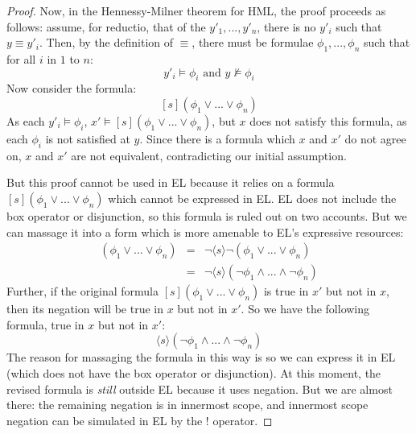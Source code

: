 \documentclass[smallextended]{svjour3}       %
\numberwithin{subcase}{mycase}
\begin{document}
\begin{proof}
Now, in the Hennessy-Milner theorem for HML, the proof proceeds as follows:
assume, for reductio, that of the $y'_1, ..., y'_n$, there is no $y'_i$ such that $y \equiv y'_i$.
Then, by the definition of $\equiv$, there must be formulae $\phi_1, ..., \phi_n$ such that for all $i$ in $1$ to $n$:
\[
y'_i \models \phi_i \mbox{ and } y \nvDash \phi_i
\]
Now consider the formula:
\[
[s] (\phi_1 \lor ... \lor \phi_n)
\]
As each $y'_i \models \phi_i$, $x' \models [s] (\phi_1 \lor ... \lor \phi_n)$, but $x$ does not satisfy this formula, as each $\phi_i$ is not satisfied at $y$.
Since there is a formula which $x$ and $x'$ do not agree on, $x$ and $x'$ are not equivalent, contradicting our initial assumption.

But this proof cannot be used in EL because it relies on a formula $[s] (\phi_1 \lor ... \lor \phi_n)$ which cannot be expressed in EL. 
EL does not include the box operator or disjunction, so this formula is ruled out on two accounts.
But we can massage it into a form which is more amenable to EL's expressive resources:
\begin{eqnarray}
[s] (\phi_1 \lor ... \lor \phi_n) & = & \neg \langle s \rangle \neg (\phi_1 \lor ... \lor \phi_n) \nonumber \\
	& = & \neg \langle s \rangle (\neg \phi_1\land ... \land \neg \phi_n) \nonumber
\end{eqnarray}
Further, if the original formula $[s] (\phi_1 \lor ... \lor \phi_n)$ is true in $x'$ but not in $x$, then its negation will be true in $x$ but not in $x'$. 
So we have the following formula, true in $x$ but not in $x'$:
\[
 \langle s \rangle (\neg \phi_1\land ... \land \neg \phi_n)
 \]
The reason for massaging the formula in this way is so we can express it in EL (which does not have the box operator or disjunction).
At this moment, the revised formula is \emph{still} outside EL because it uses negation. 
But we are almost there: the remaining negation is in innermost scope, and innermost scope negation can be simulated in EL by the $!$ operator. 


\end{proof}
\end{document}
